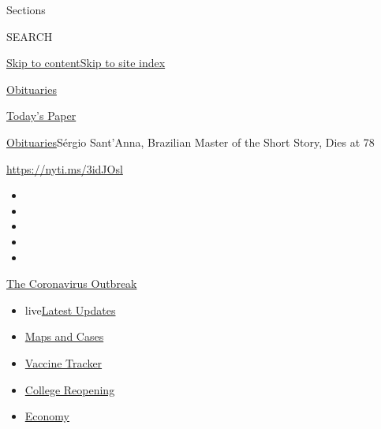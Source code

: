 Sections

SEARCH

\protect\hyperlink{site-content}{Skip to
content}\protect\hyperlink{site-index}{Skip to site index}

\href{https://www.nytimes.com/section/obituaries}{Obituaries}

\href{https://myaccount.nytimes.com/auth/login?response_type=cookie\&client_id=vi}{}

\href{https://www.nytimes.com/section/todayspaper}{Today's Paper}

\href{/section/obituaries}{Obituaries}\textbar{}Sérgio Sant'Anna,
Brazilian Master of the Short Story, Dies at 78

\url{https://nyti.ms/3idJOsl}

\begin{itemize}
\item
\item
\item
\item
\item
\end{itemize}

\href{https://www.nytimes.com/news-event/coronavirus?action=click\&pgtype=Article\&state=default\&region=TOP_BANNER\&context=storylines_menu}{The
Coronavirus Outbreak}

\begin{itemize}
\tightlist
\item
  live\href{https://www.nytimes.com/2020/08/03/world/coronavirus-covid-19.html?action=click\&pgtype=Article\&state=default\&region=TOP_BANNER\&context=storylines_menu}{Latest
  Updates}
\item
  \href{https://www.nytimes.com/interactive/2020/us/coronavirus-us-cases.html?action=click\&pgtype=Article\&state=default\&region=TOP_BANNER\&context=storylines_menu}{Maps
  and Cases}
\item
  \href{https://www.nytimes.com/interactive/2020/science/coronavirus-vaccine-tracker.html?action=click\&pgtype=Article\&state=default\&region=TOP_BANNER\&context=storylines_menu}{Vaccine
  Tracker}
\item
  \href{https://www.nytimes.com/2020/08/02/us/covid-college-reopening.html?action=click\&pgtype=Article\&state=default\&region=TOP_BANNER\&context=storylines_menu}{College
  Reopening}
\item
  \href{https://www.nytimes.com/live/2020/08/03/business/stock-market-today-coronavirus?action=click\&pgtype=Article\&state=default\&region=TOP_BANNER\&context=storylines_menu}{Economy}
\end{itemize}

